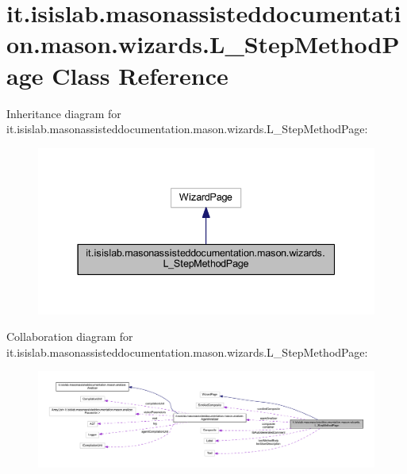 \hypertarget{classit_1_1isislab_1_1masonassisteddocumentation_1_1mason_1_1wizards_1_1_l___step_method_page}{\section{it.\-isislab.\-masonassisteddocumentation.\-mason.\-wizards.\-L\-\_\-\-Step\-Method\-Page Class Reference}
\label{classit_1_1isislab_1_1masonassisteddocumentation_1_1mason_1_1wizards_1_1_l___step_method_page}
}


Inheritance diagram for it.\-isislab.\-masonassisteddocumentation.\-mason.\-wizards.\-L\-\_\-\-Step\-Method\-Page\-:
\nopagebreak
\begin{figure}[H]
\begin{center}
\leavevmode
\includegraphics[width=337pt]{classit_1_1isislab_1_1masonassisteddocumentation_1_1mason_1_1wizards_1_1_l___step_method_page__inherit__graph}
\end{center}
\end{figure}


Collaboration diagram for it.\-isislab.\-masonassisteddocumentation.\-mason.\-wizards.\-L\-\_\-\-Step\-Method\-Page\-:
\nopagebreak
\begin{figure}[H]
\begin{center}
\leavevmode
\includegraphics[width=350pt]{classit_1_1isislab_1_1masonassisteddocumentation_1_1mason_1_1wizards_1_1_l___step_method_page__coll__graph}
\end{center}
\end{figure}
